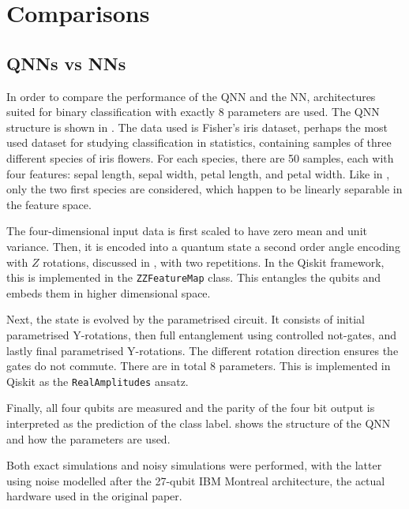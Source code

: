 \section{Comparisons}
\subsection{QNNs vs NNs}
\label{sec:qnn-vs-nn}

In order to compare the performance of the QNN and the NN, architectures suited for binary classification with exactly 8 parameters are used.
The QNN structure is shown in .
The data used is Fisher's iris dataset, perhaps the most used dataset for studying classification in statistics, containing samples of three different species of iris flowers.
For each species, there are 50 samples, each with four features: sepal length, sepal width, petal length, and petal width.
Like in \cite{abbas2021}, only the two first species are considered, which happen to be linearly separable in the feature space.

The four-dimensional input data is first scaled to have zero mean and unit variance.
Then, it is encoded into a quantum state a second order angle encoding with $Z$ rotations, discussed in , with two repetitions.
In the Qiskit framework, this is implemented in the \texttt{ZZFeatureMap} class.
This entangles the qubits and embeds them in higher dimensional space.

Next, the state is evolved by the parametrised circuit.
It consists of initial parametrised Y-rotations, then full entanglement using controlled not-gates, and lastly final parametrised Y-rotations.
The different rotation direction ensures the gates do not commute.
There are in total 8 parameters.
This is implemented in Qiskit as the \texttt{RealAmplitudes} ansatz.

Finally, all four qubits are measured and the parity of the four bit output is interpreted as the prediction of the class label.
 shows the structure of the QNN and how the parameters are used.

Both exact simulations and noisy simulations were performed, with the latter using noise modelled after the 27-qubit IBM Montreal architecture, the actual hardware used in the original paper.

